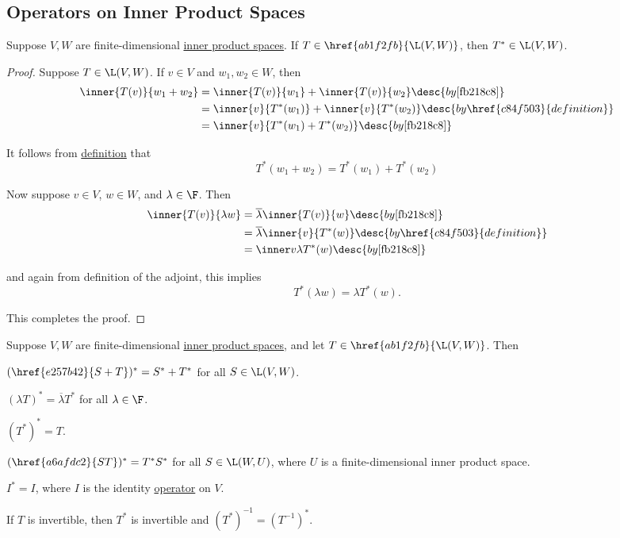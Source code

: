 \subsection{Operators on Inner Product Spaces}\label{dcef18d}

\label{f482c2f}

Suppose $V,W$ are finite-dimensional \href{b9935c8}{inner product spaces}. If
$T\in\href{ab1f2fb}{\L(V,W)}$, then $T^*\in\L(V,W)$.

\begin{proof}
  Suppose $T\in\L(V,W)$. If $v\in V$ and $w_1,w_2\in W$, then
  \begin{align*}
    \inner{T(v)}{w_1+w_2} &=\inner{T(v)}{w_1}+\inner{T(v)}{w_2}\desc{by \autoref{fb218c8}}              \\
                          &=\inner{v}{T^*(w_1)}+\inner{v}{T^*(w_2)}\desc{by \href{c84f503}{definition}} \\
                          &=\inner{v}{T^*(w_1)+T^*(w_2)}\desc{by \autoref{fb218c8}}
  \end{align*}

  It follows from \href{c84f503}{definition} that
  $$
    T^*(w_1+w_2)=T^*(w_1)+T^*(w_2)
  $$

  Now suppose $v\in V$, $w\in W$, and $\lambda\in\F$. Then
  \begin{align*}
    \inner{T(v)}{\lambda w} &=\overline\lambda\inner{T(v)}{w}\desc{by \autoref{fb218c8}}            \\
                            &=\overline\lambda\inner{v}{T^*(w)}\desc{by \href{c84f503}{definition}} \\
                            &=\inner v{\lambda T^*(w)}\desc{by \autoref{fb218c8}}
  \end{align*}

  and again from definition of the adjoint, this implies
  $$
    T^*(\lambda w)=\lambda T^*(w).
  $$

  This completes the proof.
\end{proof}

\label{ea24684}

Suppose $V,W$ are finite-dimensional \href{b9935c8}{inner product spaces}, and
let $T\in\href{ab1f2fb}{\L(V,W)}$. Then
\begin{enumerata}
  \item $(\href{e257b42}{S+T})^*=S^*+T^*$ for all $S\in\L(V,W)$.
  \item $(\lambda T)^*=\overline\lambda T^*$ for all $\lambda\in\F$.
  \item $(T^*)^*=T$.
  \item $(\href{a6afdc2}{ST})^*=T^*S^*$ for all $S\in\L(W,U)$, where $U$ is a finite-dimensional
  inner product space.
  \item $I^*=I$, where $I$ is the identity \href{bd31d9c}{operator} on $V$.
  \item If $T$ is invertible, then $T^*$ is invertible and
        $(T^*)^{-1}=(T^{-1})^*$.
\end{enumerata}

